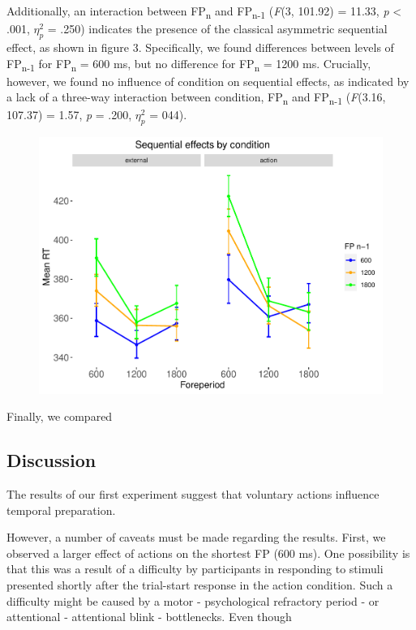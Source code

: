 \documentclass{article}
\begin{document}
Additionally, an interaction between FP\textsubscript{n} and FP\textsubscript{n-1} (\textit{F}(3, 101.92) = 11.33, \textit{p} < .001, $\eta_{p}^{2}$ = .250) indicates the presence of the classical asymmetric sequential effect, as shown in figure 3. Specifically, we found differences between levels of FP\textsubscript{n-1} for FP\textsubscript{n} = 600 ms, but no difference for FP\textsubscript{n} = 1200 ms. Crucially, however, we found no influence of condition on sequential effects, as indicated by a lack of a three-way interaction between condition, FP\textsubscript{n} and FP\textsubscript{n-1} (\textit{F}(3.16, 107.37) = 1.57, \textit{p} = .200, $\eta_{p}^{2}$ = 044).

\begin{figure}[h]
\includegraphics{SeqEff.pdf}
\centering
\end{figure}

Finally, we compared 

\subsection{Discussion}
The results of our first experiment suggest that voluntary actions influence temporal preparation.

However, a number of caveats must be made regarding the results. First, we observed a larger effect of actions on the shortest FP (600 ms). One possibility is that this was a result of a difficulty by participants in responding to stimuli presented shortly after the trial-start response in the action condition. Such a difficulty might be caused by a motor - psychological refractory period \cite{ittelstadt_evidence_2022} - or attentional - attentional blink \cite{yao_its_2023} - bottlenecks. Even though 
\end{document}
